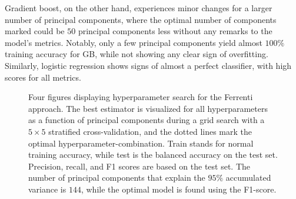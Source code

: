 Gradient boost, on the other hand, experiences minor changes for a larger number of principal components, where the optimal number of components marked could be $50$ principal components less without any remarks to the model's metrics. Notably, only a few principal components yield almost $100\%$ training accuracy for GB, while not showing any clear sign of overfitting. Similarly, logistic regression shows signs of almost a perfect classifier, with high scores for all metrics.

\clearpage

\begin{figure}[ht!]
  \begin{subfigure}[b]{1.0\textwidth}
    \centering
    
  \end{subfigure}
  \par\bigskip
  \begin{subfigure}[b]{0.5\textwidth}
    
    \caption{}
    \label{fig:q1-LOG}
  \end{subfigure}%
  \hfill
  \begin{subfigure}[b]{0.5\textwidth}
    
    \caption{}
    \label{fig:q1-DT}
  \end{subfigure}

  \begin{subfigure}[b]{0.5\textwidth}
    
    \caption{}
    \label{fig:q1-RF}
  \end{subfigure}%
  \hfill
  \begin{subfigure}[b]{0.5\textwidth}
    
    \caption{}
    \label{fig:q1-GB}
  \end{subfigure}
  \vspace*{-130mm}
  \caption{{Four figures displaying hyperparameter search for the Ferrenti approach. The best estimator is visualized for all hyperparameters as a function of principal components during a grid search with a $5\times5$ stratified cross-validation, and the dotted lines mark the optimal hyperparameter-combination. Train stands for normal training accuracy, while test is the balanced accuracy on the test set. Precision, recall, and F1 scores are based on the test set. The number of principal components that explain the $95\%$ accumulated variance is $144$, while the optimal model is found using the F1-score.}}
  \label{fig:01-pca}
\end{figure}

